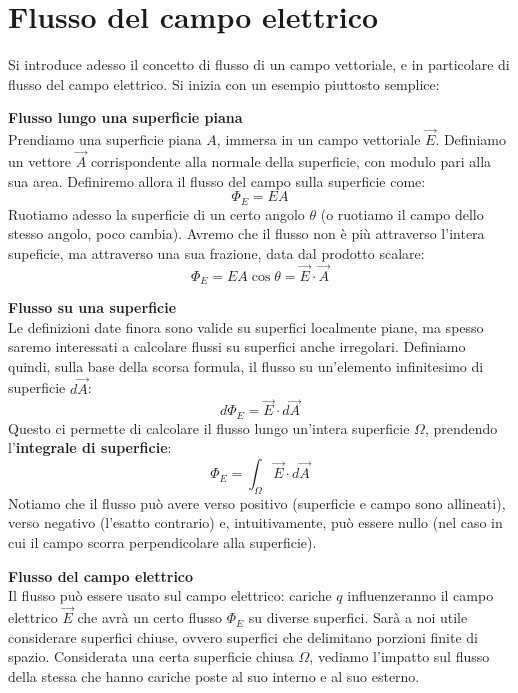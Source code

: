 \documentclass[a4paper,12pt]{article}
\begin{document}
\section{Flusso del campo elettrico}
Si introduce adesso il concetto di flusso di un campo vettoriale, e in particolare di flusso del campo elettrico. Si inizia con un esempio piuttosto semplice:
\par\smallskip
\textbf{Flusso lungo una superficie piana} \\
Prendiamo una superficie piana $A$, immersa in un campo vettoriale $\vec{E}$. Definiamo un vettore $\vec{A}$ corrispondente alla normale della superficie, con modulo pari alla sua area. Definiremo allora il flusso del campo sulla superficie come:
$$ \Phi_E = EA $$
Ruotiamo adesso la superficie di un certo angolo $\theta$ (o ruotiamo il campo dello stesso angolo, poco cambia). Avremo che il flusso non è più attraverso l'intera supeficie, ma attraverso una sua frazione, data dal prodotto scalare:
$$ \Phi_E = EA\cos{\theta} = \vec{E} \cdot \vec{A} $$
\par\smallskip
\textbf{Flusso su una superficie} \\
Le definizioni date finora sono valide su superfici localmente piane, ma spesso saremo interessati a calcolare flussi su superfici anche irregolari. Definiamo quindi, sulla base della scorsa formula, il flusso su un'elemento infinitesimo
di superficie $d\vec{A}$:
$$ d\Phi_E = \vec{E} \cdot d\vec{A} $$
Questo ci permette di calcolare il flusso lungo un'intera superficie $\Omega$, prendendo l'\textbf{integrale di superficie}:
$$ \Phi_E = \int_\Omega \vec{E} \cdot d\vec{A} $$
Notiamo che il flusso può avere verso positivo (superficie e campo sono allineati), verso negativo (l'esatto contrario) e, intuitivamente, può essere nullo (nel caso in cui il campo scorra perpendicolare alla superficie).
\par\smallskip
\textbf{Flusso del campo elettrico} \\
Il flusso può essere usato sul campo elettrico: cariche $q$ influenzeranno il campo elettrico $\vec{E}$ che avrà un certo flusso $\Phi_E$ su diverse superfici. Sarà a noi utile considerare superfici chiuse, ovvero superfici che delimitano
porzioni finite di spazio. Considerata una certa superficie chiusa $\Omega$, vediamo l'impatto sul flusso della stessa
che hanno cariche poste al suo interno e al suo esterno.
\end{document}
